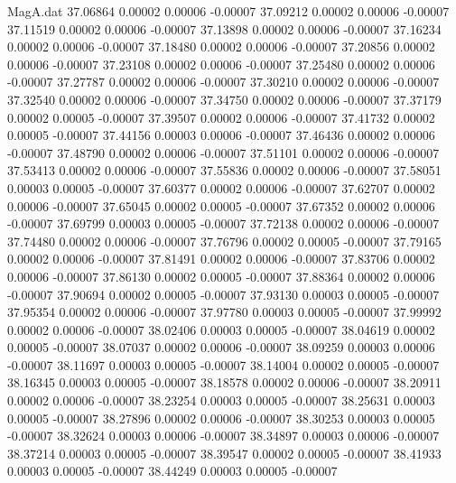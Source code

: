 \begin{filecontents}{MagA.dat}
  37.06864    0.00002    0.00006   -0.00007
  37.09212    0.00002    0.00006   -0.00007
  37.11519    0.00002    0.00006   -0.00007
  37.13898    0.00002    0.00006   -0.00007
  37.16234    0.00002    0.00006   -0.00007
  37.18480    0.00002    0.00006   -0.00007
  37.20856    0.00002    0.00006   -0.00007
  37.23108    0.00002    0.00006   -0.00007
  37.25480    0.00002    0.00006   -0.00007
  37.27787    0.00002    0.00006   -0.00007
  37.30210    0.00002    0.00006   -0.00007
  37.32540    0.00002    0.00006   -0.00007
  37.34750    0.00002    0.00006   -0.00007
  37.37179    0.00002    0.00005   -0.00007
  37.39507    0.00002    0.00006   -0.00007
  37.41732    0.00002    0.00005   -0.00007
  37.44156    0.00003    0.00006   -0.00007
  37.46436    0.00002    0.00006   -0.00007
  37.48790    0.00002    0.00006   -0.00007
  37.51101    0.00002    0.00006   -0.00007
  37.53413    0.00002    0.00006   -0.00007
  37.55836    0.00002    0.00006   -0.00007
  37.58051    0.00003    0.00005   -0.00007
  37.60377    0.00002    0.00006   -0.00007
  37.62707    0.00002    0.00006   -0.00007
  37.65045    0.00002    0.00005   -0.00007
  37.67352    0.00002    0.00006   -0.00007
  37.69799    0.00003    0.00005   -0.00007
  37.72138    0.00002    0.00006   -0.00007
  37.74480    0.00002    0.00006   -0.00007
  37.76796    0.00002    0.00005   -0.00007
  37.79165    0.00002    0.00006   -0.00007
  37.81491    0.00002    0.00006   -0.00007
  37.83706    0.00002    0.00006   -0.00007
  37.86130    0.00002    0.00005   -0.00007
  37.88364    0.00002    0.00006   -0.00007
  37.90694    0.00002    0.00005   -0.00007
  37.93130    0.00003    0.00005   -0.00007
  37.95354    0.00002    0.00006   -0.00007
  37.97780    0.00003    0.00005   -0.00007
  37.99992    0.00002    0.00006   -0.00007
  38.02406    0.00003    0.00005   -0.00007
  38.04619    0.00002    0.00005   -0.00007
  38.07037    0.00002    0.00006   -0.00007
  38.09259    0.00003    0.00006   -0.00007
  38.11697    0.00003    0.00005   -0.00007
  38.14004    0.00002    0.00005   -0.00007
  38.16345    0.00003    0.00005   -0.00007
  38.18578    0.00002    0.00006   -0.00007
  38.20911    0.00002    0.00006   -0.00007
  38.23254    0.00003    0.00005   -0.00007
  38.25631    0.00003    0.00005   -0.00007
  38.27896    0.00002    0.00006   -0.00007
  38.30253    0.00003    0.00005   -0.00007
  38.32624    0.00003    0.00006   -0.00007
  38.34897    0.00003    0.00006   -0.00007
  38.37214    0.00003    0.00005   -0.00007
  38.39547    0.00002    0.00005   -0.00007
  38.41933    0.00003    0.00005   -0.00007
  38.44249    0.00003    0.00005   -0.00007

\end{filecontents}
